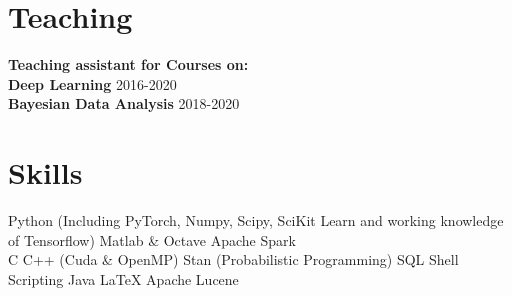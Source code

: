 \documentclass[]{deedy-resume}
\begin{document}
\begin{minipage}[t]{0.35\textwidth}
\section{Teaching} 
\textbf{Teaching assistant for Courses on:}\\
\textbullet{} \textbf{Deep Learning} 2016-2020\\
\textbullet{} \textbf{Bayesian Data Analysis} 2018-2020 \\





\section{Skills}
\textbullet{} Python (Including  PyTorch, Numpy, Scipy, SciKit Learn and working knowledge of Tensorflow) \textbullet{} Matlab \& Octave  \textbullet{} Apache Spark \\
\sectionsep
{}
\textbullet{} C \textbullet{} C++ (Cuda \& OpenMP) \textbullet{} Stan (Probabilistic Programming) \textbullet{} SQL \textbullet{} Shell Scripting \textbullet{} Java \textbullet{} \LaTeX \textbullet{} Apache Lucene \\

%
%

\end{minipage} 
\hfill
\end{document}

